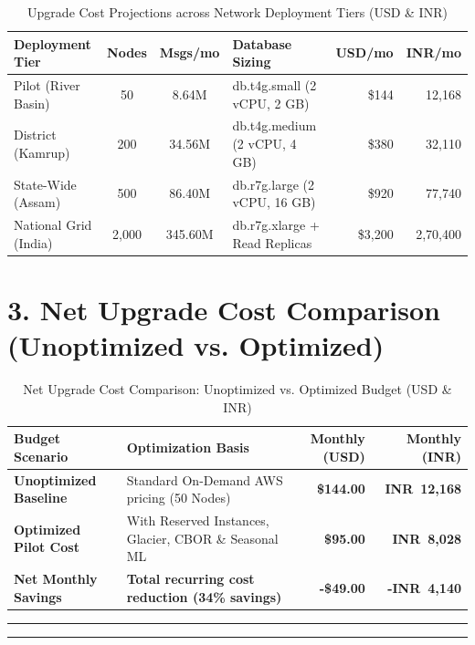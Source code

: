 \documentclass[10pt,a4paper]{article}
\begin{document}
\begin{table}[H]
\centering
\renewcommand{\arraystretch}{1.15}
\footnotesize
\begin{tabularx}{\linewidth}{l c c X r r}
\toprule
\textbf{Deployment Tier} & \textbf{Nodes} & \textbf{Msgs/mo} & \textbf{Database Sizing} & \textbf{USD/mo} & \textbf{INR/mo} \\
\midrule
Pilot (River Basin)     &    50 &   8.64M & db.t4g.small (2 vCPU, 2 GB)   & \$144   & 12,168 \\
District (Kamrup)       &   200 &  34.56M & db.t4g.medium (2 vCPU, 4 GB)  & \$380   & 32,110 \\
State-Wide (Assam)      &   500 &  86.40M & db.r7g.large (2 vCPU, 16 GB)  & \$920   & 77,740 \\
National Grid (India)   & 2,000 & 345.60M & db.r7g.xlarge + Read Replicas & \$3,200 & 2,70,400 \\
\bottomrule
\end{tabularx}
\caption{Upgrade Cost Projections across Network Deployment Tiers (USD \& INR)}
\label{tab:scaling}
\end{table}

\vspace{4pt}
\section*{3. Net Upgrade Cost Comparison (Unoptimized vs. Optimized)}

\begin{table}[H]
\centering
\renewcommand{\arraystretch}{1.15}
\footnotesize
\begin{tabularx}{\linewidth}{l X r r}
\toprule
\textbf{Budget Scenario} & \textbf{Optimization Basis} & \textbf{Monthly (USD)} & \textbf{Monthly (INR)} \\
\midrule
\textbf{Unoptimized Baseline} & Standard On-Demand AWS pricing (50 Nodes)              & \textbf{\$144.00} & \textbf{INR~12,168} \\
\textbf{Optimized Pilot Cost} & With Reserved Instances, Glacier, CBOR \& Seasonal ML  & \textbf{\$95.00}  & \textbf{INR~8,028} \\
\midrule
\textbf{Net Monthly Savings}  & \textbf{Total recurring cost reduction (34\% savings)} & \textbf{-\$49.00} & \textbf{-INR~4,140} \\
\bottomrule
\end{tabularx}
\caption{Net Upgrade Cost Comparison: Unoptimized vs. Optimized Budget (USD \& INR)}
\label{tab:summary}
\end{table}

\vspace{6pt}
\begin{center}
  {\color{AWSOrg}\rule{0.3\linewidth}{1.5pt}}
  \quad
  {\color{FloodBlue}\rule{0.3\linewidth}{1.5pt}}
\end{center}
\end{document}
